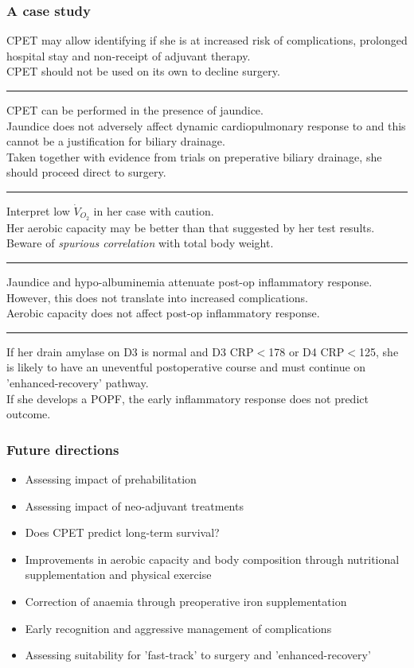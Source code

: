 \documentclass[10pt]{beamer}
\begin{document}
\begin{frame}
	\frametitle{A case study}
	\begin{description}
	{\scriptsize 	
		\item [Ch 2] CPET may allow identifying if she is at increased risk of complications, prolonged hospital stay and non-receipt of adjuvant therapy. 
					\\ CPET should not be used on its own to decline surgery. 
					\hrule
		\item [Ch 3] CPET can be performed in the presence of jaundice. 
					\\ Jaundice does not adversely affect dynamic cardiopulmonary response to and this cannot be a justification for biliary drainage. 
					\\ Taken together with evidence from trials on preperative biliary drainage, she should proceed direct to surgery.
						\hrule
		\item [Ch 4] Interpret low $\dot{V}_{O_2}$ in her case with caution. 
					\\ Her aerobic capacity may be better than that suggested by her test results. 
					\\ Beware of \textit{spurious correlation} with total body weight.
						\hrule
		\item [Ch 5] Jaundice and hypo-albuminemia attenuate post-op inflammatory response.
					\\ However, this does not translate into increased complications. 
					\\ Aerobic capacity does not affect post-op inflammatory response.
						\hrule
		\item [Ch 6] If her drain amylase on D3 is normal and D3 CRP$<$178 or D4 CRP$<$125, she is likely to have an uneventful postoperative course and must continue on 'enhanced-recovery' pathway.
				\\ If she develops a POPF, the early inflammatory response does not predict outcome.
	}
	\end{description}
\end{frame}

\begin{frame}
	\frametitle{Future directions}
	\begin{itemize}
		\item Assessing impact of prehabilitation
		\item Assessing impact of neo-adjuvant treatments
		\item Does CPET predict long-term survival?
		\item Improvements in aerobic capacity and body composition through nutritional supplementation and physical exercise
		\item Correction of anaemia through preoperative iron supplementation
		\item Early recognition and aggressive management of complications
		\item Assessing suitability for 'fast-track' to surgery and 'enhanced-recovery'
	\end{itemize}
	

\end{frame}
\end{document}
